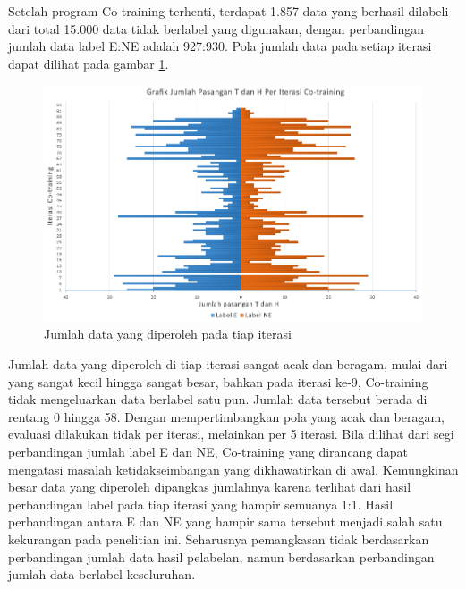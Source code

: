 Setelah program Co-training terhenti, terdapat 1.857 data yang berhasil dilabeli dari total 15.000 data tidak berlabel yang digunakan, dengan perbandingan jumlah data label E:NE adalah 927:930. Pola jumlah data pada setiap iterasi dapat dilihat pada gambar \ref{pic:jumlah-iterasi}.
\begin{figure}
	\centering
	\includegraphics[width=1\linewidth]{pics/grafik-jumlah}
	\caption{Jumlah data yang diperoleh pada tiap iterasi}
	\label{pic:jumlah-iterasi}
\end{figure}	
\noindent Jumlah data yang diperoleh di tiap iterasi sangat acak dan beragam, mulai dari yang sangat kecil hingga sangat besar, bahkan pada iterasi ke-9, Co-training tidak mengeluarkan data berlabel  satu pun. Jumlah data tersebut berada di rentang 0 hingga 58. Dengan mempertimbangkan pola yang acak dan beragam, evaluasi dilakukan tidak per iterasi, melainkan per 5 iterasi. Bila dilihat dari segi perbandingan jumlah label E dan NE, Co-training yang dirancang dapat mengatasi masalah ketidakseimbangan yang dikhawatirkan di awal. Kemungkinan besar data yang diperoleh dipangkas jumlahnya karena terlihat dari hasil perbandingan label pada tiap iterasi yang hampir semuanya 1:1. Hasil perbandingan antara E dan NE yang hampir sama tersebut menjadi salah satu kekurangan pada penelitian ini. Seharusnya pemangkasan tidak berdasarkan perbandingan jumlah data hasil pelabelan, namun berdasarkan perbandingan jumlah data berlabel keseluruhan.

